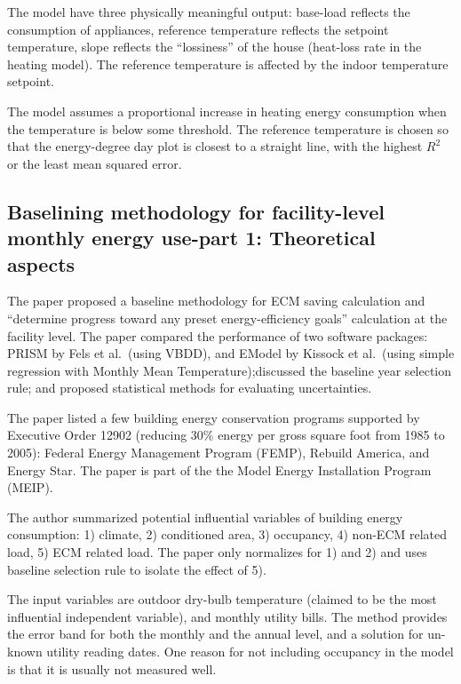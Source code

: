 \documentclass[12pt]{article}
\begin{document}
The model have three physically meaningful output: base-load reflects
the consumption of appliances, reference temperature reflects the
setpoint temperature, slope reflects the ``lossiness'' of the house
(heat-loss rate in the heating model). The reference temperature is
affected by the indoor temperature setpoint.

The model assumes a proportional increase in heating energy
consumption when the temperature is below some threshold.  The
reference temperature is chosen so that the energy-degree day plot is
closest to a straight line, with the highest $R^2$ or the least mean
squared error.
\subsection{Baselining methodology for facility-level monthly energy
  use-part 1: Theoretical aspects~\cite{reddy1997baselining}}
The paper proposed a baseline methodology for ECM saving calculation
and ``determine progress toward any preset energy-efficiency goals''
calculation at the facility level. The paper compared the performance
of two software packages: PRISM by Fels et al.\ (using VBDD), and
EModel by Kissock et al.\ (using simple regression with Monthly Mean
Temperature);discussed the baseline year selection rule; and proposed
statistical methods for evaluating uncertainties.

The paper listed a few building energy conservation programs supported
by Executive Order 12902 (reducing 30\% energy per gross square foot
from 1985 to 2005): Federal Energy Management Program (FEMP), Rebuild
America, and Energy Star. The paper is part of the the Model Energy
Installation Program (MEIP).

The author summarized potential influential variables of building
energy consumption: 1) climate, 2) conditioned area, 3) occupancy, 4)
non-ECM related load, 5) ECM related load. The paper only normalizes
for 1) and 2) and uses baseline selection rule to isolate the effect
of 5).

The input variables are outdoor dry-bulb temperature (claimed to be
the most influential independent variable), and monthly utility
bills. The method provides the error band for both the monthly and the
annual level, and a solution for un-known utility reading dates. One
reason for not including occupancy in the model is that it is usually
not measured well.
\end{document}
